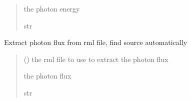 \documentclass[letterpaper,10pt,english]{sphinxmanual}
\begin{document}
\begin{fulllineitems}
\begin{fulllineitems}
\begin{quote}
\begin{description}
\sphinxAtStartPar
the photon energy

\sphinxAtStartPar
str

\end{description}\end{quote}

\end{fulllineitems}


\begin{fulllineitems}
\label{\detokenize{API:raypyng.postprocessing.PostProcess.extract_nrays_from_source}}
\pysigstartsignatures
\pysiglinewithargsret
{}
{}
{}
\pysigstopsignatures
\sphinxAtStartPar
Extract photon flux from rml file, find source automatically
\begin{quote}\begin{description}
\sphinxAtStartPar
{} () \textendash{} the rml file to use to extract the photon flux

\sphinxAtStartPar
the photon flux

\sphinxAtStartPar
str

\end{description}\end{quote}

\end{fulllineitems}



\end{fulllineitems}
\end{document}
